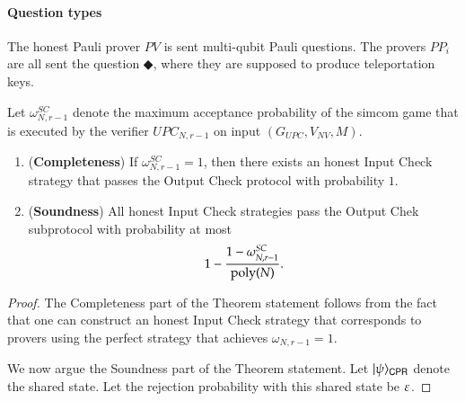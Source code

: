 
\paragraph{Question types} 
The honest Pauli prover $PV$ is sent multi-qubit Pauli questions. The provers $PP_i$ are all sent the question $\Diamondblack$, where they are supposed to produce teleportation keys.

\begin{lemma}	
\label{lem:output_check}
Let $\omega_{N,r-1}^{SC}$ denote the maximum acceptance probability of the simcom game that is executed by the verifier $UPC_{N,r-1}$ on input $(G_{UPC},V_{NV},M)$. 
\begin{enumerate}
	\item (\textbf{Completeness}) If $\omega_{N,r-1}^{SC} = 1$, then there exists an honest Input Check strategy that passes the Output Check protocol with probability $1$.
	
	\item (\textbf{Soundness}) All honest Input Check strategies pass the Output Chek subprotocol with probability at most 
\[
	1 - \frac{1 - \omega_{N,r-1}^{SC}}{\operatorname{poly}(N)}.
\] 
\end{enumerate}
\end{lemma}
\begin{proof}
The Completeness part of the Theorem statement follows from the fact that one can construct an honest Input Check strategy that corresponds to provers using the perfect strategy that achieves $\omega_{N,r-1} = 1$.

We now argue the Soundness part of the Theorem statement. Let $|\psi\rangle_{{\mathsf{C}} {\mathsf{P}} {\mathsf{R}}}$ denote the shared state. Let the rejection probability with this shared state be $\varepsilon$. 

\end{proof}



